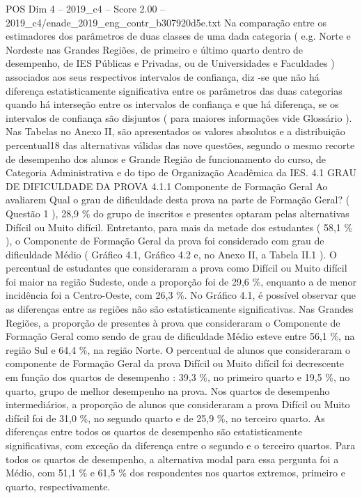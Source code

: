 \begin{textsample}{POS Dim 4 – 2019\_c4 – Score 2.00 – 2019\_c4/enade\_2019\_eng\_contr\_b307920d5e.txt}
Na comparação entre os estimadores dos parâmetros de duas classes de uma dada categoria ( e.g.
Norte e Nordeste nas Grandes Regiões, de primeiro e último quarto dentro de desempenho, de IES Públicas e Privadas, ou de Universidades e Faculdades ) associados aos seus respectivos intervalos de confiança, diz -se que não há diferença estatisticamente significativa entre os parâmetros das duas categorias quando há interseção entre os intervalos de confiança e que há diferença, se os intervalos de confiança são disjuntos ( para maiores informações vide Glossário ).
Nas Tabelas no Anexo II, são apresentados os valores absolutos e a distribuição percentual18 das alternativas válidas das nove questões, segundo o mesmo recorte de desempenho dos alunos e Grande Região de funcionamento do curso, de Categoria Administrativa e do tipo de Organização Acadêmica da IES. 4.1 GRAU DE DIFICULDADE DA PROVA 4.1.1 Componente de Formação Geral Ao avaliarem Qual o grau de dificuldade desta prova na parte de Formação Geral? ( Questão 1 ), 28,9 \% do grupo de inscritos e presentes optaram pelas alternativas Difícil ou Muito difícil.
Entretanto, para mais da metade dos estudantes ( 58,1 \% ), o Componente de Formação Geral da prova foi considerado com grau de dificuldade Médio ( Gráfico 4.1, Gráfico 4.2 e, no Anexo II, a Tabela II.1 ).
O percentual de estudantes que consideraram a prova como Difícil ou Muito difícil foi maior na região Sudeste, onde a proporção foi de 29,6 \%, enquanto a de menor incidência foi a Centro-Oeste, com 26,3 \%.
No Gráfico 4.1, é possível observar que as diferenças entre as regiões não são estatisticamente significativas.
Nas Grandes Regiões, a proporção de presentes à prova que consideraram o Componente de Formação Geral como sendo de grau de dificuldade Médio esteve entre 56,1 \%, na região Sul e 64,4 \%, na região Norte.
O percentual de alunos que consideraram o componente de Formação Geral da prova Difícil ou Muito difícil foi decrescente em função dos quartos de desempenho : 39,3 \%, no primeiro quarto e 19,5 \%, no quarto, grupo de melhor desempenho na prova.
Nos quartos de desempenho intermediários, a proporção de alunos que consideraram a prova Difícil ou Muito difícil foi de 31,0 \%, no segundo quarto e de 25,9 \%, no terceiro quarto.
As diferenças entre todos os quartos de desempenho são estatisticamente significativas, com exceção da diferença entre o segundo e o terceiro quartos.
Para todos os quartos de desempenho, a alternativa modal para essa pergunta foi a Médio, com 51,1 \% e 61,5 \% dos respondentes nos quartos extremos, primeiro e quarto, respectivamente.

\end{textsample}
